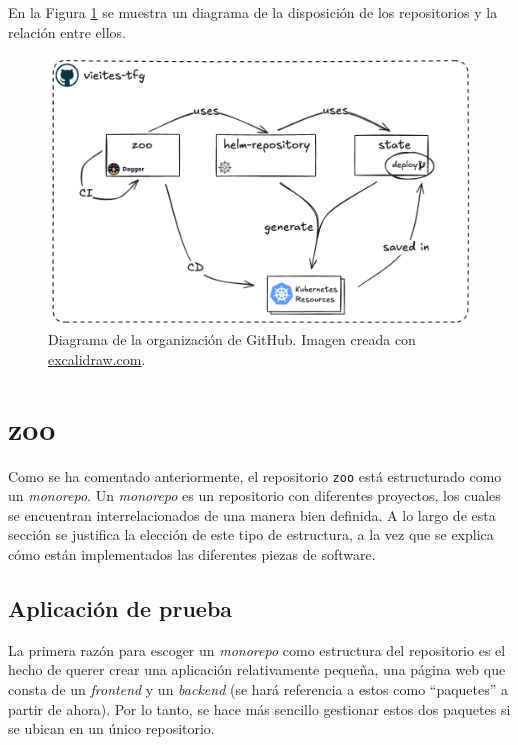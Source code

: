 En la Figura \ref{fig:ghorg} se muestra un diagrama de la disposición de los repositorios y la relación entre ellos.

\begin{figure}[h]
  \centerline{\includegraphics[width=14cm]{figuras/vieites-tfg}}
  \caption{Diagrama de la organización de GitHub. Imagen creada con \href{https://excalidraw.com}{excalidraw.com}.}
  \label{fig:ghorg}
\end{figure}

\section{zoo}

Como se ha comentado anteriormente, el repositorio \texttt{zoo} está estructurado como un \textit{monorepo}. Un \textit{monorepo} es un repositorio con diferentes proyectos, los cuales se encuentran interrelacionados de una manera bien definida. A lo largo de esta sección se justifica la elección de este tipo de estructura, a la vez que se explica cómo están implementados las diferentes piezas de software.

\subsection*{Aplicación de prueba}

La primera razón para escoger un \textit{monorepo} como estructura del repositorio es el hecho de querer crear una aplicación relativamente pequeña, una página web que consta de un \textit{frontend} y un \textit{backend} (se hará referencia a estos como ``paquetes'' a partir de ahora). Por lo tanto, se hace más sencillo gestionar estos dos paquetes si se ubican en un único repositorio.

